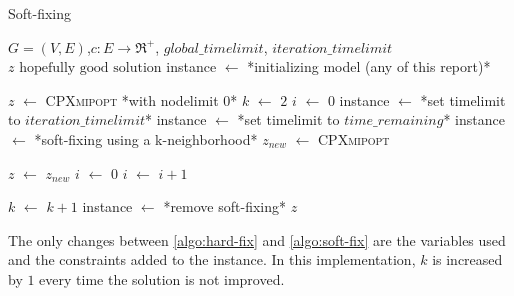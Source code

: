 \begin{algorithm}
	\caption{Soft-fixing}\label{algo:soft-fix}
	\begin{algorithmic}[1]
		\Require $G=(V,E)$,$ c:E\rightarrow \Re^+$, $global\_timelimit$, $iteration\_timelimit$
		\Ensure $z\text{ hopefully good solution}$
		\State instance $\gets$ *initializing model (any of this report)*
		
		\State  $z$ $\gets$ \textsc{CPXmipopt} *with nodelimit 0*
		\State $k$ $\gets$ $2$
		\State $i$ $\gets$ $0$
		\State instance $\gets$ *set timelimit to $iteration\_timelimit$*
		\Else 
		\State instance $\gets$ *set timelimit to $time\_remaining$*
		\EndIf
		\State instance $\gets$ *soft-fixing using a k-neighborhood*
		\State $z_{new}$ $\gets$ \textsc{CPXmipopt}
		
		\State $z$ $\gets$ $z_{new}$
		\State $i$ $\gets$ $0$
		\Else 
		\State $i$ $\gets$ $i+1$
		\EndIf
		
		\State $k$ $\gets$ $k + 1$
		\EndIf
		\State instance $\gets$ *remove soft-fixing*
		\EndWhile
		\State \Return $z$
	\end{algorithmic}
\end{algorithm}

The only changes between \ref{algo:hard-fix} and \ref{algo:soft-fix} are the variables used and the constraints added to the instance. In this implementation, $k$ is increased by $1$ every time the solution is not improved.
